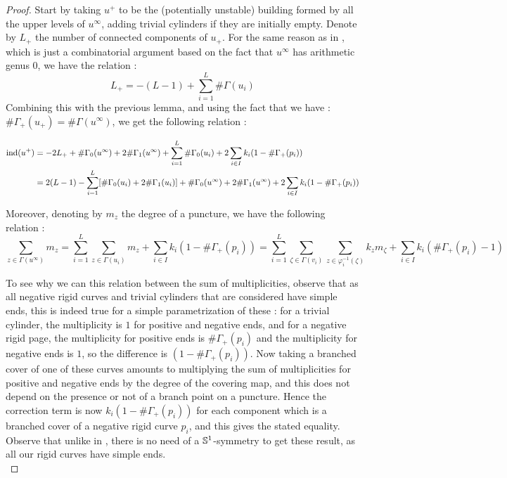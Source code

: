 \documentclass[../main.tex]{subfiles}
\begin{document}
\begin{proof}
Start by taking $u^+$ to be the (potentially unstable) building formed by all the upper levels of $u^\infty$, adding trivial cylinders if they are initially empty. Denote by $L_ +$ the number of connected components of $u_+$. For the same reason as in \cite{SOBD2}, which is just a combinatorial argument based on the fact that $u^\infty$ has arithmetic genus $0$, we have the relation :
$$L_+ = -(L-1) + \sum_{i = 1}^L\#\Gamma(u_i)$$
Combining this with the previous lemma, and using the fact that we have : $\#\Gamma_+(u_+) = \#\Gamma(u^\infty)$, we get the following relation :

\begin{align*}
\text{ind}(u^+) &= - 2L_+ + \#\Gamma_0(u^\infty) + 2\#\Gamma_1(u^\infty) + \sum_{i= 1}^L\#\Gamma_0(u_i)+ 2\sum_{i\in I}k_i(1-\#\Gamma_+(p_i))\\
&  = 2(L-1) - \sum_{i = 1}^L[\#\Gamma_0(u_i) + 2 \#\Gamma_1(u_i)] + \#\Gamma_0(u^\infty) + 2\#\Gamma_1(u^\infty) + 2\sum_{i\in I}k_i(1-\#\Gamma_+(p_i))
\end{align*}

Moreover, denoting by $m_z$ the degree of a puncture, we have the following relation : 
$$\sum_{z\in \Gamma(u^{\infty})}{m_z} = \sum_{i = 1}^L\sum_{z\in\Gamma(u_i)}m_z + \sum_{i \in I}k_i(1 - \#\Gamma_+(p_i)) = \sum_{i = 1}^L\sum_{\zeta\in\Gamma(v_i)}\sum_{z\in\varphi_i^{-1}(\zeta)}k_z m_{\zeta} + \sum_{i \in I}k_i( \#\Gamma_+(p_i)-1)$$

To see why we can this relation between the sum of multiplicities, observe that as all negative rigid curves and trivial cylinders that are considered have simple ends, this is indeed true for a simple parametrization of these : for a trivial cylinder, the multiplicity is $1$ for positive and negative ends, and for a negative rigid page, the multiplicity for positive ends is $\#\Gamma_+(p_i)$ and the multiplicity for negative ends is $1$, so the difference is $(1-\#\Gamma_+(p_i))$. Now taking a branched cover of one of these curves amounts to multiplying the sum of multiplicities for positive and negative ends by the degree of the covering map, and this does not depend on the presence or not of a branch point on a puncture. Hence the correction term is now $k_i(1- \#\Gamma_+(p_i))$ for each component which is a branched cover of a negative rigid curve $p_i$, and this gives the stated equality. Observe that unlike in \cite{SOBD2}, there is no need of a $\mathbb{S}^1$-symmetry to get these result, as all our rigid curves have simple ends.\\


\end{proof}
\end{document}
